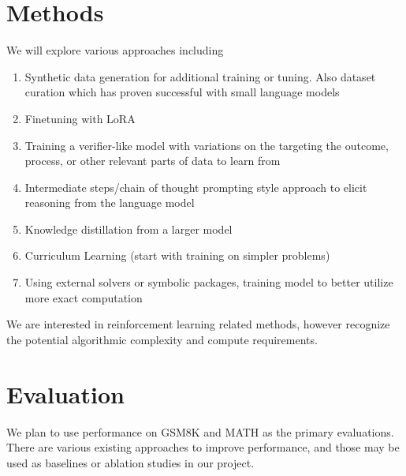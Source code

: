 \documentclass{article}
\begin{document}
\section{Methods}
We will explore various approaches including
\begin{enumerate}
\item Synthetic data generation for additional training or tuning. Also dataset curation which has proven successful with small language models \cite{gunasekar} 
\item Finetuning with LoRA \cite{hu}
\item Training a verifier-like model with variations on the targeting the outcome, process, or other relevant parts of data to learn from
\item Intermediate steps/chain of thought \cite{wei} prompting style approach to elicit reasoning from the language model
\item Knowledge distillation from a larger model
\item Curriculum Learning (start with training on simpler problems)
\item Using external solvers or symbolic packages, training model to better utilize more exact computation
\end{enumerate}

We are interested in reinforcement learning related methods, however recognize the potential algorithmic complexity and compute requirements.



\section{Evaluation}
We plan to use performance on GSM8K and MATH as the primary evaluations. There are various existing approaches to improve performance, and those may be used as baselines or ablation studies in our project.



\end{document}
